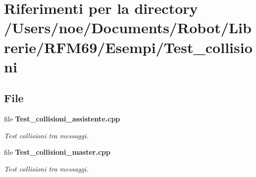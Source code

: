 \section{Riferimenti per la directory /\+Users/noe/\+Documents/\+Robot/\+Librerie/\+R\+F\+M69/\+Esempi/\+Test\+\_\+collisioni}
\label{dir_49bd0589e47ac3d20aed64592c48abcc}
\subsection*{File}
\begin{DoxyCompactItemize}
\item 
file \textbf{ Test\+\_\+collisioni\+\_\+assistente.\+cpp}
\begin{DoxyCompactList}\small\item\em Test collisioni tra messaggi. \end{DoxyCompactList}\item 
file \textbf{ Test\+\_\+collisioni\+\_\+master.\+cpp}
\begin{DoxyCompactList}\small\item\em Test collisioni tra messaggi. \end{DoxyCompactList}\end{DoxyCompactItemize}
